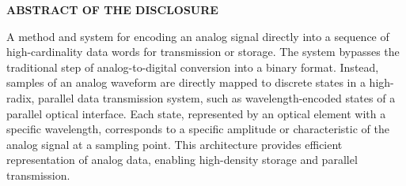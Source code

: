 \documentclass[11pt,letterpaper]{article}
\begin{document}
\thispagestyle{empty}

\begin{center}
    \textbf{\large ABSTRACT OF THE DISCLOSURE}
\end{center}

\vspace{0.6cm}

A method and system for encoding an analog signal directly into a sequence of high-cardinality data words for transmission or storage. The system bypasses the traditional step of analog-to-digital conversion into a binary format. Instead, samples of an analog waveform are directly mapped to discrete states in a high-radix, parallel data transmission system, such as wavelength-encoded states of a parallel optical interface. Each state, represented by an optical element with a specific wavelength, corresponds to a specific amplitude or characteristic of the analog signal at a sampling point. This architecture provides efficient representation of analog data, enabling high-density storage and parallel transmission.
\end{document}
